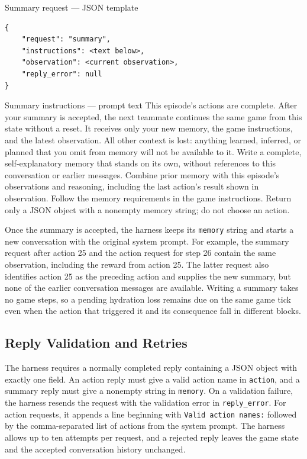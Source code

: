 \begin{pilotmessage}{Summary request --- JSON template}
\begin{verbatim}
{
    "request": "summary",
    "instructions": <text below>,
    "observation": <current observation>,
    "reply_error": null
}
\end{verbatim}
\end{pilotmessage}

\begin{pilotmessage}{Summary instructions --- prompt text}
    This episode's actions are complete.
    After your summary is accepted, the next teammate continues the same game from this state without a reset.
    It receives only your new memory, the game instructions, and the latest observation.
    All other context is lost: anything learned, inferred, or planned that you omit from memory will not be available to it.
    Write a complete, self-explanatory memory that stands on its own, without references to this conversation or earlier messages.
    Combine prior memory with this episode's observations and reasoning, including the last action's result shown in observation.
    Follow the memory requirements in the game instructions.
    Return only a JSON object with a nonempty memory string; do not choose an action.
\end{pilotmessage}

Once the summary is accepted, the harness keeps its \verb|memory| string and starts a new conversation with the original system prompt.
For example, the summary request after action 25 and the action request for step 26 contain the same observation, including the reward from action 25.
The latter request also identifies action 25 as the preceding action and supplies the new summary, but none of the earlier conversation messages are available.
Writing a summary takes no game steps, so a pending hydration loss remains due on the same game tick even when the action that triggered it and its consequence fall in different blocks.

\subsection{Reply Validation and Retries}

The harness requires a normally completed reply containing a JSON object with exactly one field.
An action reply must give a valid action name in \verb|action|, and a summary reply must give a nonempty string in \verb|memory|.
On a validation failure, the harness resends the request with the validation error in \verb|reply_error|.
For action requests, it appends a line beginning with \verb|Valid action names:| followed by the comma-separated list of actions from the system prompt.
The harness allows up to ten attempts per request, and a rejected reply leaves the game state and the accepted conversation history unchanged.


